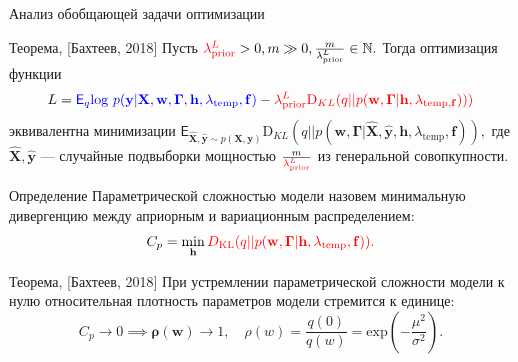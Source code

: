 \documentclass[usenames,dvipsnames,11pt,pdf,utf8,russian,aspectratio=43]{beamer}
\begin{document}
\begin{frame}{Анализ обобщающей задачи оптимизации}
\small


\begin{block}{Теорема, [Бахтеев, 2018]}
Пусть $\textcolor{red}{\lambda_\text{prior}^L} > 0, m \gg 0, \frac{m}{\lambda_\text{prior}^L} \in \mathbb{N}.$ Тогда оптимизация функции\vspace{-0.3cm} \[L = 
\textcolor{blue}{\mathsf{E}_q \text{log}~{p(\mathbf{y} | \mathbf{X}, \mathbf{w}, \boldsymbol{\Gamma}, \mathbf{h}, \lambda_{\text{temp}},\mathbf{f})}} - \textcolor{red}{\lambda_\text{prior}^L\text{D}_{KL}(q||p(\mathbf{w}, \boldsymbol{\Gamma} |\mathbf{h}, \lambda_{\text{temp}, \mathbf{f}})))}\vspace{-0.2cm}\] эквивалентна минимизации $\mathsf{E}_{\hat{\mathbf{X}}, \hat{\mathbf{y}}\sim p(\mathbf{X}, \mathbf{y})}\text{D}_{KL}(q||p(\mathbf{w}, \boldsymbol{\Gamma} | \hat{\mathbf{X}}, \hat{\mathbf{y}},\mathbf{h},\lambda_{\text{temp}},\mathbf{f})),$ где $\hat{\mathbf{X}}, \hat{\mathbf{y}}$ --- случайные подвыборки мощностью $\frac{m}{\textcolor{red}{\lambda_\text{prior}^L}}$ из генеральной совопкупности.
\end{block}

\begin{block}{Определение}
Параметрической сложностью модели назовем минимальную дивергенцию между априорным и вариационным распределением:
\vspace{-0.2cm}
\[
    C_p = \min_{\mathbf{h}} \textcolor{red}{D_\text{KL}(q||p(\mathbf{w}, \boldsymbol{\Gamma}|\mathbf{h},\lambda_\text{temp}, \mathbf{f})).}
\]
\end{block}

\begin{block}{Теорема, [Бахтеев, 2018]}
При устремлении параметрической сложности модели к нулю относительная плотность параметров модели стремится к единице:
\vspace{-0.3cm}
\[
    C_p \to 0 \implies \boldsymbol{\rho}(\mathbf{w}) \to 1, \quad \rho(w) = \frac{q(0)}{q(w)} = \text{exp}\left(-\frac{\mu^2}{\sigma^2}\right).
\]
\end{block}




\end{frame}
\end{document}
